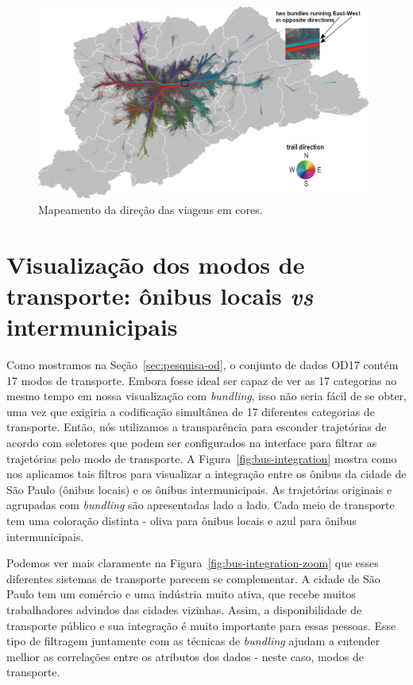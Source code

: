 \begin{figure}[!htb]
  \centering
  \captionsetup{justification=centering}
  \includegraphics[width=0.98\textwidth]{../figuras/directions.png}
  \caption{Mapeamento da direção das viagens em cores. \label{fig:attributes-direction}}
\end{figure}

\section{Visualização dos modos de transporte: ônibus locais \emph{vs} intermunicipais}
\label{sec:coloring}

Como mostramos na Seção~\ref{sec:pesquisa-od}, o conjunto de dados OD17 contém
17 modos de transporte. Embora fosse ideal ser capaz de ver as 17 categorias ao
mesmo tempo em nossa visualização com \emph{bundling}, isso não seria fácil de
se obter, uma vez que exigiria a codificação simultânea de 17 diferentes
categorias de transporte. Então, nós utilizamos a transparência para esconder
trajetórias de acordo com seletores que podem ser configurados na interface para
filtrar as trajetórias pelo modo de transporte. A
Figura~\ref{fig:bus-integration} mostra como nos aplicamos tais filtros para
visualizar a integração entre os ônibus da cidade de São Paulo (ônibus locais) e
os ônibus intermunicipais. As trajetórias originais e agrupadas com \emph{bundling}
são apresentadas lado a lado. Cada meio de transporte tem uma coloração distinta -
oliva para ônibus locais e azul para ônibus intermunicipais.

Podemos ver mais claramente na Figura~\ref{fig:bus-integration-zoom} que esses diferentes sistemas
de transporte parecem se complementar. A cidade de São Paulo tem um comércio e
uma indústria muito ativa, que recebe muitos trabalhadores advindos das cidades
vizinhas. Assim, a disponibilidade de transporte público e sua integração é
muito importante para essas pessoas. Esse tipo de filtragem juntamente com as
técnicas de \emph{bundling} ajudam a entender melhor as correlações entre os
atributos dos dados - neste caso, modos de transporte.

